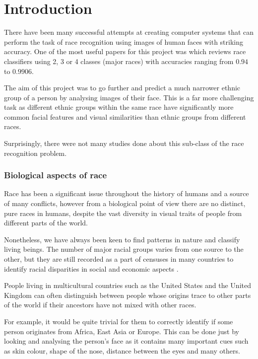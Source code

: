 \chapter{Introduction}
\label{introduction}

There have been many successful attempts at creating computer systems that can
perform the task of race recognition using images of human faces with striking
accuracy. One of the most useful papers for this project was \citep{muhammadg}
which reviews race classifiers using 2, 3 or 4 classes (major races) with
accuracies ranging from $0.94$ to $0.9906$.

The aim of this project was to go further and predict a much narrower ethnic
group of a person by analysing images of their face. This is a far more
challenging task as different ethnic groups within the same race have
significantly more common facial features and visual similarities than ethnic
groups from different races.

Surprisingly, there were not many studies done about this sub-class of the race
recognition problem.

\subsection{Biological aspects of race}
Race has been a significant issue throughout the history of humans 
and a source of many conflicts, however from a biological point of view
there are no distinct, pure races in humans, despite the vast diversity 
in visual traits of people from different parts of the world. \citep{onRace}

Nonetheless, we have always been keen to find patterns in nature and 
classify living beings. The number of major racial groups varies from 
one source to the other, but they are still recorded as a part of censuses 
in many countries to identify racial disparities in social and economic aspects 
\citep{censusRace}.

People living in multicultural countries such as the United States and the 
United Kingdom can often distinguish between people whose origins trace to other
parts of the world if their ancestors have not mixed with other races.

For example, it would be quite trivial for them to correctly identify if some
person originates from Africa, East Asia or Europe. This can be done just by
looking and analysing the person's face as it contains many important cues such
as skin colour, shape of the nose, distance between the eyes and many others.

